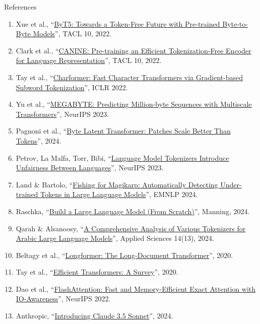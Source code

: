 \begin{frame}{References}
  \scriptsize
  \begin{enumerate}\itemsep0.05em
    \setcounter{enumi}{11}
    \item Xue et al., ``\href{https://arxiv.org/abs/2105.13626}{ByT5: Towards a Token-Free Future with Pre-trained Byte-to-Byte Models}'', TACL 10, 2022.
    \item Clark et al., ``\href{https://arxiv.org/abs/2103.06874}{CANINE: Pre-training an Efficient Tokenization-Free Encoder for Language Representation}'', TACL 10, 2022.
    \item Tay et al., ``\href{https://arxiv.org/abs/2106.12672}{Charformer: Fast Character Transformers via Gradient-based Subword Tokenization}'', ICLR 2022.
    \item Yu et al., ``\href{https://arxiv.org/abs/2305.07185}{MEGABYTE: Predicting Million-byte Sequences with Multiscale Transformers}'', NeurIPS 2023.
    \item Pagnoni et al., ``\href{https://arxiv.org/abs/2412.09871}{Byte Latent Transformer: Patches Scale Better Than Tokens}'', 2024.
    \item Petrov, La Malfa, Torr, Bibi, ``\href{https://arxiv.org/abs/2305.15425}{Language Model Tokenizers Introduce Unfairness Between Languages}'', NeurIPS 2023.
    \item Land \& Bartolo, ``\href{https://arxiv.org/abs/2405.05417}{Fishing for Magikarp: Automatically Detecting Under-trained Tokens in Large Language Models}'', EMNLP 2024.
    \item Raschka, ``\href{https://www.manning.com/books/build-a-large-language-model-from-scratch}{Build a Large Language Model (From Scratch)}'', Manning, 2024.
    \item Qarah \& Alsanoosy, ``\href{https://doi.org/10.3390/app14135696}{A Comprehensive Analysis of Various Tokenizers for Arabic Large Language Models}'', Applied Sciences 14(13), 2024.
    \item Beltagy et al., ``\href{https://arxiv.org/abs/2004.05150}{Longformer: The Long-Document Transformer}'', 2020.
    \item Tay et al., ``\href{https://arxiv.org/abs/2009.06732}{Efficient Transformers: A Survey}'', 2020.
    \item Dao et al., ``\href{https://arxiv.org/abs/2205.14135}{FlashAttention: Fast and Memory-Efficient Exact Attention with IO-Awareness}'', NeurIPS 2022.
    \item Anthropic, ``\href{https://www.anthropic.com/news/claude-3-5-sonnet}{Introducing Claude 3.5 Sonnet}'', 2024.
  \end{enumerate}
\end{frame}
